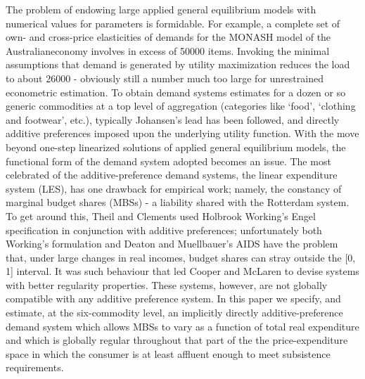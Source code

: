The problem of endowing large applied general equilibrium models with numerical values for parameters is formidable. For example, a complete set of own- and cross-price elasticities of demands for the MONASH model of the Australianeconomy involves in excess of 50000 items. Invoking the minimal assumptions that demand is generated by utility maximization reduces the load to about 26000 - obviously still a number much too large for unrestrained econometric estimation. To obtain demand systems estimates for a dozen or so generic commodities at a top level of aggregation (categories like ‘food’, ‘clothing and footwear’, etc.), typically Johansen's lead has been followed, and directly additive preferences imposed upon the underlying utility function. With the move beyond one-step linearized solutions of applied general equilibrium models, the functional form of the demand system adopted becomes an issue. The most celebrated of the additive-preference demand systems, the linear expenditure system (LES), has one drawback for empirical work; namely, the constancy of marginal budget shares (MBSs) - a liability shared with the Rotterdam system. To get around this, Theil and Clements used Holbrook Working's Engel specification in conjunction with additive preferences; unfortunately both Working's formulation and Deaton and Muellbauer's AIDS have the problem that, under large changes in real incomes, budget shares can stray outside the [0, 1] interval. It was such behaviour that led Cooper and McLaren to devise systems with better regularity properties. These systems, however, are not globally compatible with any additive preference system. In this paper we specify, and estimate, at the six-commodity level, an implicitly directly additive-preference demand system which allows MBSs to vary as a function of total real expenditure and which is globally regular throughout that part of the the price-expenditure space in which the consumer is at least affluent enough to meet subsistence requirements.
